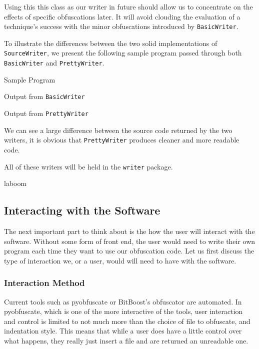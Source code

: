 \documentclass[twoside,a4paper]{report}
\begin{document}
Using this this class as our writer in future should allow us to concentrate on the effects of specific obfuscations later. It will avoid clouding the evaluation
of a technique's success with the minor obfuscations introduced by \texttt{BasicWriter}.

To illustrate the differences between the two solid implementations of \texttt{SourceWriter}, we present the following sample program passed
through both \texttt{BasicWriter} and \texttt{PrettyWriter}.

Sample Program



Output from \texttt{BasicWriter}



Output from \texttt{PrettyWriter}



We can see a large difference between the source code returned by the two writers, it is obvious that
\texttt{PrettyWriter} produces cleaner and more readable code.

All of these writers will be held in the \texttt{writer} package.

laboom

\subsection{Interacting with the Software}

The next important part to think about is the how the user will interact with the software. Without some form of front end, the
user would need to write their own program each time they want to use our obfuscation code. Let us first discuss the type of
interaction we, or a user, would will need to have with the software.

\subsubsection{Interaction Method}

Current tools such as pyobfuscate or BitBoost's obfuscator are automated. In pyobfuscate, which is one of the more interactive
of the tools, user interaction and control is limited to not much more than the choice of file to obfuscate, and indentation style. This means
that while a user does have a little control over what happens, they really just insert a file and are returned an
unreadable one.
\end{document}
